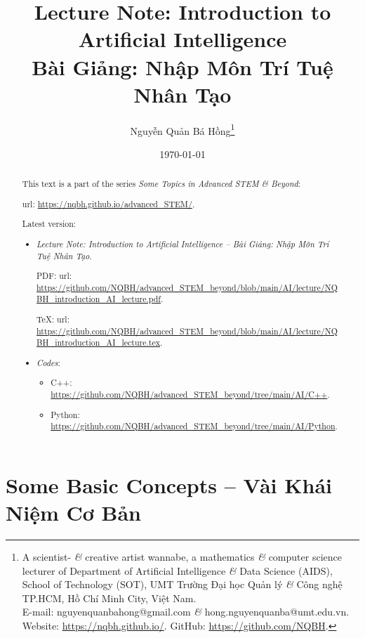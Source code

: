 \documentclass{article}
\title{Lecture Note: Introduction to Artificial Intelligence\\Bài Giảng: Nhập Môn Trí Tuệ Nhân Tạo}
\author{Nguyễn Quản Bá Hồng\footnote{A scientist- {\it\&} creative artist wannabe, a mathematics {\it\&} computer science lecturer of Department of Artificial Intelligence {\it\&} Data Science (AIDS), School of Technology (SOT), UMT Trường Đại học Quản lý {\it\&} Công nghệ TP.HCM, Hồ Chí Minh City, Việt Nam.\\E-mail: {\sf nguyenquanbahong@gmail.com} {\it\&} {\sf hong.nguyenquanba@umt.edu.vn}. Website: \url{https://nqbh.github.io/}. GitHub: \url{https://github.com/NQBH}.}}
\date{\today}
\begin{document}
\maketitle
\begin{abstract}
	This text is a part of the series {\it Some Topics in Advanced STEM \& Beyond}:
	
	{\sc url}: \url{https://nqbh.github.io/advanced_STEM/}.
	
	Latest version:
	\begin{itemize}
		\item {\it Lecture Note: Introduction to Artificial Intelligence -- Bài Giảng: Nhập Môn Trí Tuệ Nhân Tạo}.
		
		PDF: {\sc url}: \url{https://github.com/NQBH/advanced_STEM_beyond/blob/main/AI/lecture/NQBH_introduction_AI_lecture.pdf}.
		
		\TeX: {\sc url}: \url{https://github.com/NQBH/advanced_STEM_beyond/blob/main/AI/lecture/NQBH_introduction_AI_lecture.tex}.
		\item {\it Codes}:
		\begin{itemize}
			\item C++: \url{https://github.com/NQBH/advanced_STEM_beyond/tree/main/AI/C++}.
			\item Python: \url{https://github.com/NQBH/advanced_STEM_beyond/tree/main/AI/Python}.
		\end{itemize}
	\end{itemize}
\end{abstract}
\tableofcontents


\section{Some Basic Concepts -- Vài Khái Niệm Cơ Bản}
\end{document}
